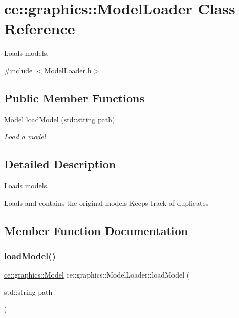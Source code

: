 \hypertarget{classce_1_1graphics_1_1_model_loader}{}\section{ce\+:\+:graphics\+:\+:Model\+Loader Class Reference}
\label{classce_1_1graphics_1_1_model_loader}


Loads models.  




{\ttfamily \#include $<$Model\+Loader.\+h$>$}

\subsection*{Public Member Functions}
\begin{DoxyCompactItemize}
\item 
\hyperlink{classce_1_1graphics_1_1_model}{Model} \hyperlink{classce_1_1graphics_1_1_model_loader_aee7761094a5e10a81555b4a695a55043}{load\+Model} (std\+::string path)
\begin{DoxyCompactList}\small\item\em Load a model. \end{DoxyCompactList}\end{DoxyCompactItemize}


\subsection{Detailed Description}
Loads models. 

Loads and contains the original models Keeps track of duplicates 

\subsection{Member Function Documentation}
\mbox{\label{classce_1_1graphics_1_1_model_loader_aee7761094a5e10a81555b4a695a55043}} 
\subsubsection{\texorpdfstring{load\+Model()}{loadModel()}}
{\footnotesize\ttfamily \hyperlink{classce_1_1graphics_1_1_model}{ce\+::graphics\+::\+Model} ce\+::graphics\+::\+Model\+Loader\+::load\+Model (\begin{DoxyParamCaption}\item[{std\+::string}]{path }\end{DoxyParamCaption})}



